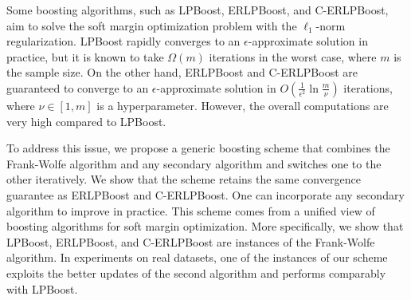 Some boosting algorithms, such as LPBoost, ERLPBoost, and C-ERLPBoost, 
aim to solve 
the soft margin optimization problem with the $\ell_1$-norm regularization. 
LPBoost rapidly converges to an $\epsilon$-approximate solution 
in practice, 
but it is known to take $\Omega(m)$ iterations in the worst case,
where $m$ is the sample size.
On the other hand, ERLPBoost and C-ERLPBoost are 
guaranteed to converge to an $\epsilon$-approximate solution 
in $O(\frac{1}{\epsilon^2} \ln \frac{m}{\nu})$ iterations, 
where $\nu \in [1, m]$ is a hyperparameter. 
However, the overall computations are very high compared to LPBoost. 

To address this issue,
we propose a generic boosting scheme 
that combines the Frank-Wolfe algorithm and any secondary algorithm 
and switches one to the other iteratively.
We show that the scheme retains the same convergence guarantee 
as ERLPBoost and C-ERLPBoost. 
One can incorporate any secondary algorithm to improve in practice.
This scheme comes from 
a unified view of boosting algorithms for soft margin optimization. 
More specifically, 
we show that LPBoost, ERLPBoost, and C-ERLPBoost are instances 
of the Frank-Wolfe algorithm. 
In experiments on real datasets, 
one of the instances of our scheme 
exploits the better updates of the second algorithm 
and performs comparably with LPBoost. %

